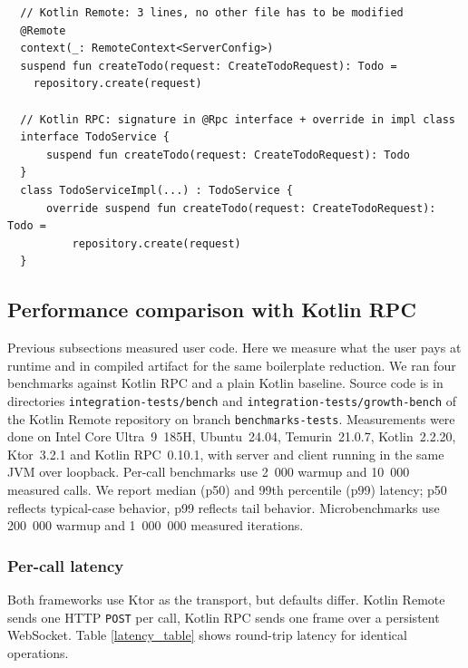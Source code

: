 \documentclass[a4paper,11pt,oneside]{article}
\begin{document}
\begin{listing}[!h]
  \begin{verbatim}
  // Kotlin Remote: 3 lines, no other file has to be modified
  @Remote
  context(_: RemoteContext<ServerConfig>)
  suspend fun createTodo(request: CreateTodoRequest): Todo = 
    repository.create(request)

  // Kotlin RPC: signature in @Rpc interface + override in impl class
  interface TodoService {
      suspend fun createTodo(request: CreateTodoRequest): Todo
  }
  class TodoServiceImpl(...) : TodoService {
      override suspend fun createTodo(request: CreateTodoRequest): Todo =
          repository.create(request)
  }
  \end{verbatim}
  \caption{Code required for one remote function}\label{per_function_compare}
\end{listing}

\subsection{Performance comparison with Kotlin RPC}

Previous subsections measured user code. Here we measure what the user pays at runtime
and in compiled artifact for the same boilerplate reduction. We ran four benchmarks
against Kotlin RPC and a plain Kotlin baseline. Source code is in directories
\texttt{integration-tests/bench} and \texttt{integration-tests/growth-bench} of
the Kotlin Remote repository \cite{enotvtapke_kotlin-remote_2026} on branch \texttt{benchmarks-tests}. Measurements were
done on Intel Core Ultra~9~185H, Ubuntu~24.04, Temurin~21.0.7, Kotlin~2.2.20, Ktor~3.2.1
and Kotlin RPC~0.10.1, with server and client running in the same JVM over loopback.
Per-call benchmarks use 2~000 warmup and 10~000 measured calls. We report median (p50)
and 99th percentile (p99) latency; p50 reflects typical-case behavior, p99 reflects tail
behavior. Microbenchmarks use 200~000 warmup and 1~000~000 measured iterations.

\subsubsection{Per-call latency}\label{per_call_latency_section}

Both frameworks use Ktor as the transport, but defaults differ. Kotlin Remote sends one
HTTP \texttt{POST} per call, Kotlin RPC sends one frame over a persistent WebSocket.
Table \ref{latency_table} shows round-trip latency for identical operations.
\end{document}
